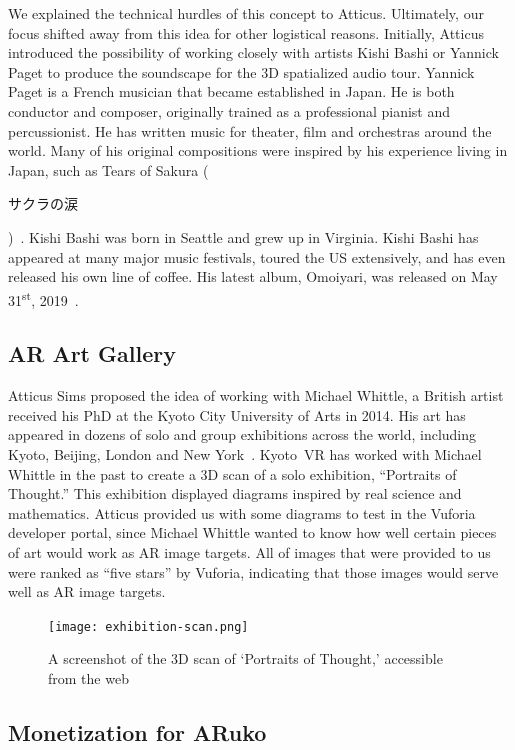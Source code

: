 \documentclass[a4paper, 10pt, american, titlepage]{article}
\begin{document}
We explained the technical hurdles of this concept to Atticus. Ultimately, our
focus shifted away from this idea for other logistical reasons. Initially,
Atticus introduced the possibility of working closely with artists Kishi Bashi
or Yannick Paget to produce the soundscape for the 3D spatialized audio tour.
Yannick Paget is a French musician that became established in Japan. He is both
conductor and composer, originally trained as a professional pianist and
percussionist. He has written music for theater, film and orchestras around the
world. Many of his original compositions were inspired by his experience living
in Japan, such as Tears of Sakura
(\begin{CJK}{UTF8}{min}サクラの涙\end{CJK})~\autocite{yannickpaget2016}. Kishi
Bashi was born in Seattle and grew up in Virginia. Kishi Bashi has appeared at
many major music festivals, toured the US extensively, and has even released his
own line of coffee. His latest album, Omoiyari, was released on May
31\textsuperscript{st}, 2019~\autocite{kishibashi2019}.

\subsection{AR Art Gallery}
\label{sec:arArtGallery}

Atticus Sims proposed the idea of working with Michael Whittle, a British artist
received his PhD at the Kyoto City University of Arts in 2014. His art has
appeared in dozens of solo and group exhibitions across the world,
including Kyoto, Beijing, London and New York~\autocite{michaelwhittle2019}.
Kyoto~VR has worked with Michael Whittle in the past to create a 3D scan of a
solo exhibition, ``Portraits of Thought.'' This exhibition displayed diagrams
inspired by real science and mathematics. Atticus provided us with some
diagrams to test in the Vuforia developer portal, since Michael Whittle wanted
to know how well certain pieces of art would work as AR image targets. All of
images that were provided to us were ranked as ``five stars'' by Vuforia,
indicating that those images would serve well as AR image targets.

\begin{figure}[h]
	\centering
	\texttt{[image: exhibition-scan.png]}
    \caption{A screenshot of the 3D scan of `Portraits of Thought,' accessible
    from the web}
	\label{fig:exhibitionScan}
\end{figure}

\subsection{Monetization for ARuko}
\label{sec:monetizationForAruko}
\end{document}
